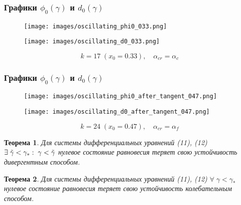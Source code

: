 \documentclass[fullscreen=true, unicode, bookmarks=false]{beamer}
\newtheorem{rustheorem}{Теорема }[subsection]
\begin{document}
\begin{frame}
\frametitle{ Графики $ \phi_0(\gamma) $ и $ d_0(\gamma) $ }

\begin{figure} 
\begin{minipage}[h]{0.49\linewidth}
\begin{center}
\texttt{[image: images/oscillating\_phi0\_033.png]}
\end{center}
\end{minipage} 
\hfill
\begin{minipage}[h]{0.49\linewidth}
\begin{center}
\texttt{[image: images/oscillating\_d0\_033.png]} 
\end{center}
\end{minipage} 
\end{figure}

$$ k = 17 \; (x_0=0.33), \quad \alpha_{cr}=\alpha_c $$

\end{frame}

\begin{frame}
\frametitle{ Графики $ \phi_0(\gamma) $ и $ d_0(\gamma) $ }

\begin{figure} 
\begin{minipage}[h]{0.49\linewidth}
\begin{center}
\texttt{[image: images/oscillating\_phi0\_after\_tangent\_047.png]}
\end{center}
\end{minipage} 
\hfill
\begin{minipage}[h]{0.49\linewidth}
\begin{center}
\texttt{[image: images/oscillating\_d0\_after\_tangent\_047.png]} 
\end{center}
\end{minipage} 
\end{figure}

$$ k = 24 \; (x_0=0.47), \quad \alpha_{cr}=\alpha_f $$

\end{frame}

\begin{frame}

\begin{rustheorem}
Для системы дифференциальных уравнений (11), (12) $\exists\;\Tilde{\gamma}<\gamma_*: \; \gamma<\Tilde{\gamma}$ нулевое состояние равновесия теряет свою устойчивость дивергентным способом.
\end{rustheorem}

\begin{rustheorem}
Для системы дифференциальных уравнений (11), (12) $\forall\;\gamma<\gamma_*$ нулевое состояние равновесия теряет свою устойчивость колебательным способом.
\end{rustheorem}

\end{frame}

\begin{frame}
\titlepage
\end{frame}
\end{document}
